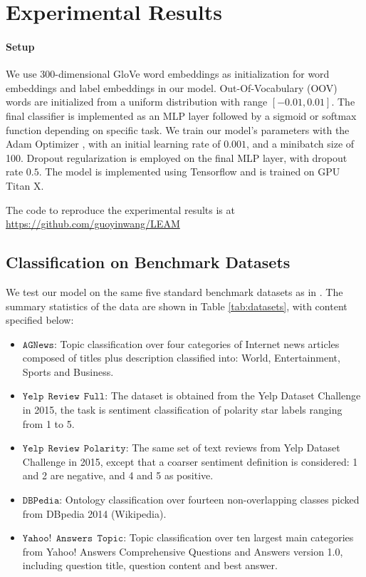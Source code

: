\documentclass[11pt,a4paper]{article}
\begin{document}
\section{Experimental Results}
\paragraph{Setup} We use 300-dimensional GloVe word embeddings \citet{pennington2014glove} as initialization for word embeddings and label embeddings in our model. Out-Of-Vocabulary (OOV) words are initialized from a uniform distribution with range $[-0.01, 0.01]$. The final classifier is implemented as an MLP layer followed by a sigmoid or softmax function depending on specific task. We train our model's parameters with the Adam Optimizer \citep{kingma2014adam}, with an initial learning rate of $0.001$, and a minibatch size of 100. Dropout regularization \citep{srivastava2014dropout} is employed on the final MLP layer, with dropout rate $0.5$. The model is implemented using Tensorflow and is trained  on GPU Titan X. 

The code to reproduce the experimental results is at~
{\small  \url{https://github.com/guoyinwang/LEAM}}
\subsection{Classification on Benchmark Datasets}
We test our model on the same five standard benchmark datasets as in \citep{zhang2015character}. The summary statistics of the data are shown in Table \ref{tab:datasets}, with content specified below:
\begin{itemize}
	\item $\mathtt{AGNews}$: Topic classification over four categories of Internet news articles~\citep{del2005ranking} composed of titles plus description classified into: World, Entertainment, Sports and Business. 
\item $\mathtt{Yelp~~Review~~Full}$: The dataset is obtained from the Yelp Dataset Challenge in 2015, the task is sentiment classification of polarity star labels ranging from 1 to 5.
\item $\mathtt{Yelp~~Review~~Polarity}$: The same set of text reviews from Yelp Dataset Challenge in 2015, except that a coarser sentiment definition is considered: 1 and 2 are negative, and 4 and 5 as positive. 
\item $\mathtt{DBPedia}$: Ontology classification over fourteen non-overlapping classes picked from DBpedia 2014 (Wikipedia).
\item 
	$\mathtt{Yahoo!~~Answers~~Topic}$: Topic classification over ten largest main categories from Yahoo! Answers Comprehensive Questions and Answers version 1.0, including question title, question content and best answer. 
\end{itemize}
\end{document}
